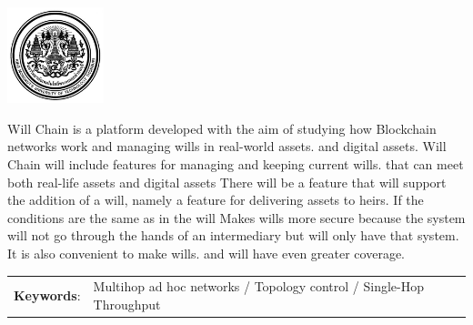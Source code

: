 \documentclass[12pt,oneside,openright,a4paper]{cpe-thai-project}
\begin{document}
\pdfstringdefDisableCommands{%
\let\MakeUppercase\relax
}

\begin{center}
  \includegraphics[width=2.8cm]{logo02.jpg}
\end{center}
\vspace*{-1cm}

\maketitlepage
\makesignaturepage 

\abstract

Will Chain is a platform developed with the aim of studying how Blockchain networks work and managing wills in real-world assets. and digital assets. Will Chain will include features for managing and keeping current wills. that can meet both real-life assets and digital assets There will be a feature that will support the addition of a will, namely a feature for delivering assets to heirs. If the conditions are the same as in the will Makes wills more secure because the system will not go through the hands of an intermediary but will only have that system. It is also convenient to make wills. and will have even greater coverage.

\begin{flushleft}
\begin{tabular*}{\textwidth}{@{}lp{}}
\textbf{Keywords}: & Multihop ad hoc networks / Topology control / Single-Hop Throughput
\end{tabular*}
\end{flushleft}
\endabstract

\newcommand\tab[1][1cm]{\hspace*{#1}}
\thaiabstract
\end{document}
